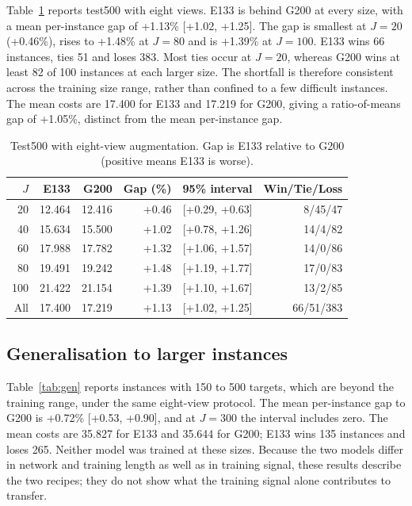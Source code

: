 \documentclass[preprint,12pt,authoryear]{elsarticle}
\begin{document}
Table~\ref{tab:test500} reports test500 with eight views. E133 is behind G200 at every size, with a mean per-instance gap of +1.13\% [+1.02, +1.25]. The gap is smallest at $J = 20$ (+0.46\%), rises to +1.48\% at $J = 80$ and is +1.39\% at $J = 100$. E133 wins 66 instances, ties 51 and loses 383. Most ties occur at $J = 20$, whereas G200 wins at least 82 of 100 instances at each larger size. The shortfall is therefore consistent across the training size range, rather than confined to a few difficult instances. The mean costs are 17.400 for E133 and 17.219 for G200, giving a ratio-of-means gap of +1.05\%, distinct from the mean per-instance gap.

\begin{table}[t]
\centering
\caption{Test500 with eight-view augmentation. Gap is E133 relative to G200 (positive means E133 is worse).}
\label{tab:test500}
\small
\begin{tabular}{rrrrrr}
\toprule
$J$ & E133 & G200 & Gap (\%) & 95\% interval & Win/Tie/Loss \\
\midrule
20 & 12.464 & 12.416 & +0.46 & [+0.29, +0.63] & 8/45/47 \\
40 & 15.634 & 15.500 & +1.02 & [+0.78, +1.26] & 14/4/82 \\
60 & 17.988 & 17.782 & +1.32 & [+1.06, +1.57] & 14/0/86 \\
80 & 19.491 & 19.242 & +1.48 & [+1.19, +1.77] & 17/0/83 \\
100 & 21.422 & 21.154 & +1.39 & [+1.10, +1.67] & 13/2/85 \\
All & 17.400 & 17.219 & +1.13 & [+1.02, +1.25] & 66/51/383 \\
\bottomrule
\end{tabular}
\end{table}

\subsection{Generalisation to larger instances}

Table~\ref{tab:gen} reports instances with 150 to 500 targets, which are beyond the training range, under the same eight-view protocol. The mean per-instance gap to G200 is +0.72\% [+0.53, +0.90], and at $J = 300$ the interval includes zero. The mean costs are 35.827 for E133 and 35.644 for G200; E133 wins 135 instances and loses 265. Neither model was trained at these sizes. Because the two models differ in network and training length as well as in training signal, these results describe the two recipes; they do not show what the training signal alone contributes to transfer.
\end{document}
